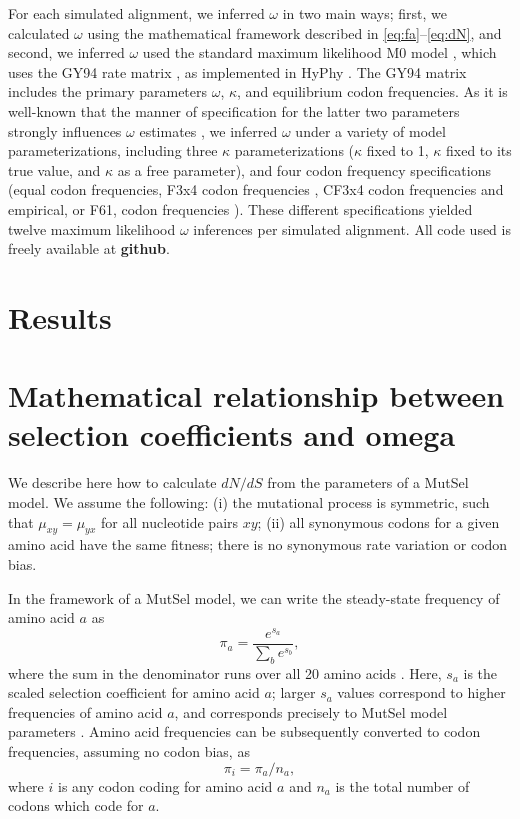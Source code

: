 \documentclass[11pt]{article}
\begin{document}
For each simulated alignment, we inferred $\omega$ in two main ways; first, we calculated $\omega$ using the mathematical framework described in \eqref{eq:fa}--\eqref{eq:dN}, and second, we inferred $\omega$ used the standard maximum likelihood M0 model \cite{NielsenYang1998}, which uses the GY94 rate matrix \cite{GoldmanYang1994}, as implemented in HyPhy \cite{KosakovskyPondetal2005}. The GY94 matrix includes the primary parameters $\omega$, $\kappa$, and equilibrium codon frequencies. As it is well-known that the manner of specification for the latter two parameters strongly influences $\omega$ estimates \cite{YN00, Yang2006}, we inferred $\omega$ under a variety of model parameterizations, including three $\kappa$ parameterizations ($\kappa$ fixed to 1, $\kappa$ fixed to its true value, and $\kappa$ as a free parameter), and four codon frequency specifications (equal codon frequencies,  F3x4 codon frequencies \cite{MuseGaut1994}, CF3x4 codon frequencies \cite{Pond2010} and empirical, or F61, codon frequencies \cite{GoldmanYang1994}). These different specifications yielded twelve maximum likelihood $\omega$ inferences per simulated alignment. All code used is freely available at \textbf{github}.


\section*{Results}


\section*{Mathematical relationship between selection coefficients and omega}


We describe here how to calculate $dN/dS$ from the parameters of a MutSel model. We assume the following: (i) the mutational process is symmetric, such that $\mu_{xy}=\mu_{yx}$ for all nucleotide pairs $xy$; (ii) all synonymous codons for a given amino acid have the same fitness; there is no synonymous rate variation or codon bias.

In the framework of a MutSel model, we can write the steady-state frequency of amino acid $a$ as
\begin{equation}\label{eq:pi_a}
 \pi_a=\frac{e^{s_a}}{\sum_b e^{s_b}},
\end{equation}
where the sum in the denominator runs over all 20 amino acids \cite{SellaHirsh2005}. Here, $s_a$ is the scaled selection coefficient for amino acid $a$; larger $s_a$ values correspond to higher frequencies of amino acid $a$, and corresponds precisely to MutSel model parameters \cite{HalpernBruno1998}. Amino acid frequencies can be subsequently converted to codon frequencies, assuming no codon bias, as 
\begin{equation}
\pi_i = \pi_a / n_a ,	
\end{equation} where $i$ is any codon coding for amino acid $a$ and $n_a$ is the total number of codons which code for $a$.
\end{document}
